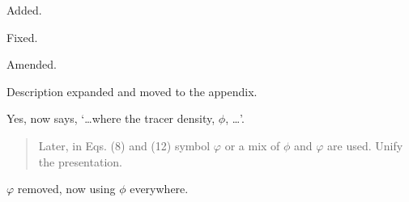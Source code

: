 \documentclass{article}
\begin{document}
\begin{quotation}
\begin{comment}
\item Section 3: It would be helpful to point out up front that you use the model in a 2D x-z slice configuration without Coriolis forces.
\end{comment}
\end{quotation}
Added.

\begin{quotation}
\begin{comment}
\item Line 142: typo `\ldots temperature, \ldots'
\end{comment}
\end{quotation}
Fixed.

\begin{quotation}
\begin{comment}
\item Line 145: There is no `Lorenz C grid staggering', the model uses the C-grid staggering in the horizontal and the Lorenz grid in the vertical.
\end{comment}
\end{quotation}
Amended.

\begin{quotation}
\begin{comment}
\item Lines 145--160: This information is disconnected from the whole paper.  Expand the explanations to make them self-explanatory and move the paragraph into an appendix.  Clarify that this treatment is only needed for nonlinear flows and that the advection uses an explicit time-stepping scheme.
\end{comment}
\end{quotation}
Description expanded and moved to the appendix.

\begin{quotation}
\begin{comment}
\item Eq. (7): The tracer symbol $\phi$ is undefined from a physical viewpoints.  Do you imply the tracer density?
\end{comment}
\end{quotation}
Yes, now says, `\ldots where the tracer density, $\phi$, \ldots'.

\begin{quotation}
Later, in Eqs. (8) and (12) symbol $\varphi$ or a mix of $\phi$ and $\varphi$ are used.  Unify the presentation.
\end{quotation}
$\varphi$ removed, now using $\phi$ everywhere.
\end{document}
